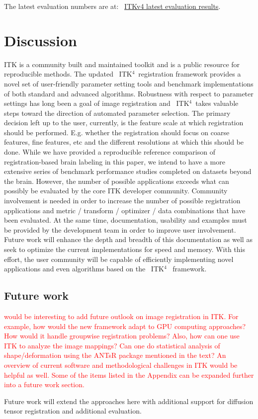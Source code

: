 \documentclass{frontiersSCNS}
\newcommand{\tk}{~ITK$^{\text{4}}$~}
\begin{document}
The latest evaluation
numbers are at:
~\textcolor{blue}{\href{https://github.com/ntustison/BSplineMorphisms}{ITKv4 latest
  evaluation results}}.


\section{Discussion} 
ITK is a community built and maintained toolkit and is a public
resource for reproducible methods.  The updated \tk registration
framework provides a novel set of user-friendly parameter setting
tools and benchmark implementations of both standard and advanced
algorithms.  Robustness with respect to parameter settings has long
been a goal of image registration and \tk takes valuable steps toward
the direction of automated parameter selection.  The primary decision
left up to the user, currently, is the feature scale at which
registration should be performed.  E.g. whether the registration should focus on coarse features, fine
features, etc and the different resolutions at which this should be
done.  While we have provided a reproducible reference comparison of
registration-based brain labeling in this paper, we intend to have a more extensive series of benchmark performance studies
completed on datasets beyond the brain.  However, the number of
possible applications exceeds what can possibly be evaluated by the
core ITK developer community.  Community involvement is needed in order to increase the
number of possible registration applications and metric / transform /
optimizer / data combinations that have been evaluated.  At the same
time, documentation, usability and examples must be provided by the
development team in order to improve user involvement.  Future work
will enhance the depth and breadth of this documentation as well as
seek to optimize the current implementations for speed and memory.
With this effort, the user community will be capable of efficiently
implementing novel applications and even algorithms based on the \tk
framework.




\subsection{Future work}

\textcolor{red}{would be interesting to add future outlook on image registration in ITK. For example, how would the new framework adapt to GPU computing approaches? How would it handle groupwise registration problems? Also, how can one use ITK to analyze the image mappings? Can one do statistical analysis of shape/deformation using the ANTsR package mentioned in the text? An overview of current software and methodological challenges in ITK would be helpful as well. Some of the items listed in the Appendix can be expanded further into a future work section. }

Future work will extend the approaches here with additional support
for diffusion tensor registration and additional evaluation.




\end{document}
